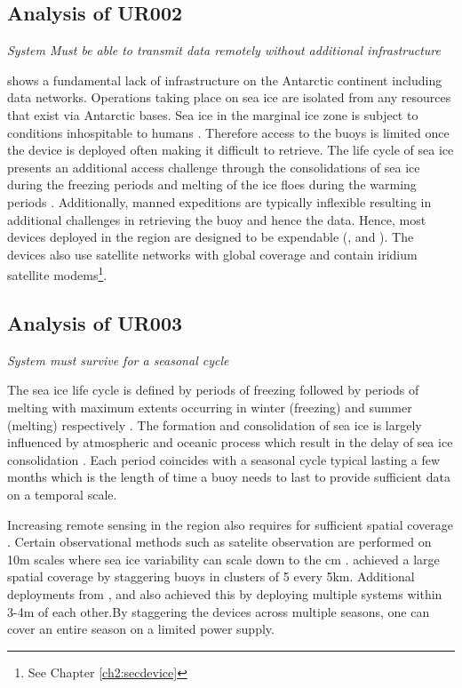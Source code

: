 \subsection{Analysis of UR002}
\textit{System Must be able to transmit data remotely without additional infrastructure}

\textcite{kennicutt2016delivering} shows a fundamental lack of infrastructure on the Antarctic continent including data networks. Operations taking place on sea ice are isolated from any resources that exist via Antarctic bases. Sea ice in the marginal ice zone is subject to conditions inhospitable to humans \cite{kennicutt2016delivering}. Therefore access to the buoys is limited once the device is deployed often making it difficult to retrieve. The life cycle of sea ice presents an additional access challenge through the consolidations of sea ice  during the freezing periods and melting  of the ice floes during the warming periods \cite{womack_2020}. Additionally, manned expeditions are typically inflexible \cite{kennicutt2016delivering} resulting in additional challenges in retrieving the buoy and hence the data. Hence, most devices deployed in the region are designed to be expendable (\cite{kohout2015device}, \cite{rabault2019open} and \cite{trident}). The devices also use satellite networks with global coverage and contain iridium satellite modems\footnote{See Chapter \ref{ch2:secdevice}}. 

\subsection{Analysis of UR003}
\textit{System must survive for a seasonal cycle}

The sea ice life cycle is defined by periods of freezing  followed by periods of melting \cite{barber2005microwave}  with maximum extents occurring in winter (freezing) and summer (melting) respectively \cite{barber2005microwave}. The formation and consolidation of sea ice is largely influenced by atmospheric and oceanic process which result in the delay of sea ice consolidation \cite{vichi2019effects}. Each period coincides with a seasonal cycle typical lasting a few months \cite{vichi2019effects} \cite{barber1948generation} which is the length of time a buoy needs to last to provide sufficient data on a temporal scale. \par 

Increasing remote sensing in the region also requires for sufficient spatial coverage \cite{albarello2020drift}. Certain observational methods such as satelite observation are performed on 10m scales \cite{galin2011validation} where sea ice variability can scale down to the cm \cite{vichi2019effects}.
\textcite{doble2017robust} achieved  a large spatial coverage by staggering buoys in clusters of 5 every 5km. Additional deployments from \cite{vichi2019effects}, \cite{kohout2015device} and \cite{albarello2020drift}
also achieved this by deploying multiple systems within 3-4m \cite{vichi2019effects} of each other.By staggering the devices across multiple seasons, one can cover an entire season on a limited power supply. \par 

